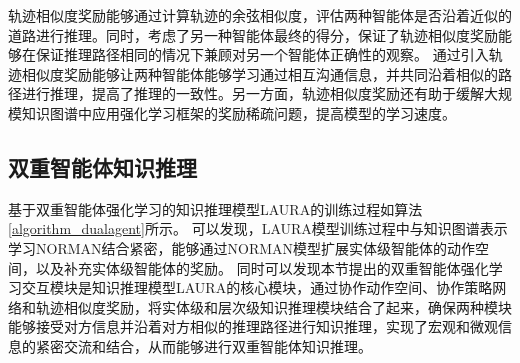 \documentclass[algorithmlist, AutoFakeBold, AutoFakeSlant, figurelist, tablelist, nomlist, engineering]{seuthesix}
\begin{document}
轨迹相似度奖励能够通过计算轨迹的余弦相似度，评估两种智能体是否沿着近似的道路进行推理。同时，考虑了另一种智能体最终的得分，保证了轨迹相似度奖励能够在保证推理路径相同的情况下兼顾对另一个智能体正确性的观察。
通过引入轨迹相似度奖励能够让两种智能体能够学习通过相互沟通信息，并共同沿着相似的路径进行推理，提高了推理的一致性。另一方面，轨迹相似度奖励还有助于缓解大规模知识图谱中应用强化学习框架的奖励稀疏问题，提高模型的学习速度。

\subsection{双重智能体知识推理}
基于双重智能体强化学习的知识推理模型LAURA的训练过程如算法\ref{algorithm_dualagent}所示。
可以发现，LAURA模型训练过程中与知识图谱表示学习NORMAN结合紧密，能够通过NORMAN模型扩展实体级智能体的动作空间，以及补充实体级智能体的奖励。
同时可以发现本节提出的双重智能体强化学习交互模块是知识推理模型LAURA的核心模块，通过协作动作空间、协作策略网络和轨迹相似度奖励，将实体级和层次级知识推理模块结合了起来，确保两种模块能够接受对方信息并沿着对方相似的推理路径进行知识推理，实现了宏观和微观信息的紧密交流和结合，从而能够进行双重智能体知识推理。
\end{document}
